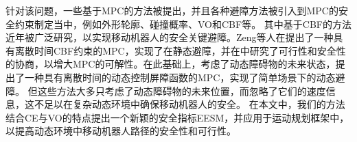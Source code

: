 \documentclass[preprint,5p,times,twocolumn]{elsarticle}
\begin{document}
针对该问题，一些基于MPC的方法被提出\citep{Ji2017PathPA}，并且各种避障方法被引入到MPC的安全约束制定当中，例如外形轮廓\citep{Brito2019ModelPC}、碰撞概率\citep{Xu2021DPMPCPlannerAR}、VO\citep{Piccinelli2023MPCBM}和CBF\citep{Manjunath2020SafeAR,Singletary2020ComparativeAO}等。
其中基于CBF的方法近年被广泛研究，以实现移动机器人的安全关键避障\citep{ames2019controlBF, Li2023ASO}。Zeng等人在\citep{Zeng2020SafetyCriticalMP}提出了一种具有离散时间CBF约束的MPC，实现了在静态避障，并在\citep{Zeng2021EnhancingFA}中研究了可行性和安全性的协商，以增大MPC的可解性。在此基础上，\citep{jian2022dynamicCB}考虑了动态障碍物的未来状态，提出了一种具有离散时间的动态控制屏障函数的MPC，实现了简单场景下的动态避障。
但这些方法大多只考虑了动态障碍物的未来位置，而忽略了它们的速度信息，这不足以在复杂动态环境中确保移动机器人的安全。
在本文中，我们的方法结合CE与VO的特点提出一个新颖的安全指标EESM，并应用于运动规划框架中，以提高动态环境中移动机器人路径的安全性和可行性。
\end{document}
